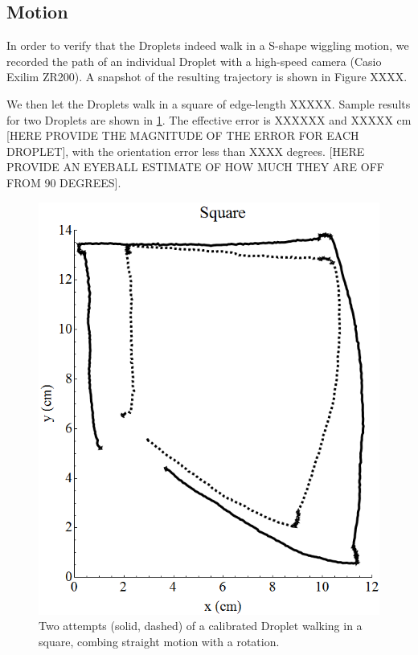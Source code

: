 \documentclass[letterpaper, 10pt, conference]{ieeeconf}
\begin{document}
\subsection{Motion}
In order to verify that the Droplets indeed walk in a S-shape wiggling motion, we recorded the path of an individual Droplet with a high-speed camera (Casio Exilim ZR200). A snapshot of the resulting trajectory is shown in Figure XXXX.

We then let the Droplets walk in a square of edge-length XXXXX. Sample results for two Droplets are shown in \ref{fig:someting}. The effective error is XXXXXX and XXXXX cm [HERE PROVIDE THE MAGNITUDE OF THE ERROR FOR EACH DROPLET], with the orientation error less than XXXX degrees. [HERE PROVIDE AN EYEBALL ESTIMATE OF HOW MUCH THEY ARE OFF FROM 90 DEGREES]. 

\begin{figure}[!htb]
\centering
\includegraphics[width=\linewidth]{Images/DropletWalksSquare}
\caption{Two attempts (solid, dashed) of a calibrated Droplet walking in a square, combing straight motion with a rotation.}
\label{fig:someting}
\end{figure}
\end{document}
